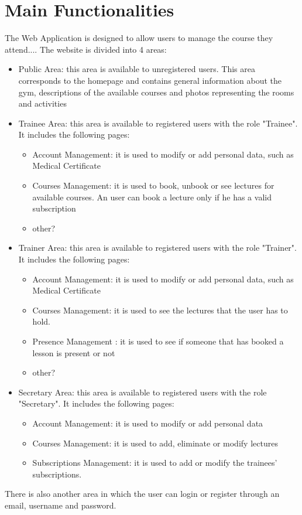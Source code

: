 \section{Main Functionalities}

The Web Application is designed to allow users to manage the course they attend....
The website is divided into 4 areas:

\begin{itemize}
	\item Public Area: this area is available to unregistered users. This area corresponds to the homepage and contains general information about the gym, descriptions of the available courses and photos representing the rooms and activities
	\item Trainee Area: this area is available to registered users with the role "Trainee". It includes the following pages:
	\begin{itemize}
		\item Account Management: it is used to modify or add personal data, such as Medical Certificate
		\item Courses Management: it is used to book, unbook or see lectures for available courses. An user can book a lecture only if he has a valid subscription
		\item other?
	\end{itemize}
	\item Trainer Area: this area is available to registered users with the role "Trainer". It includes the following pages:
	\begin{itemize}
		\item Account Management: it is used to modify or add personal data, such as Medical Certificate
		\item Courses Management: it is used to see the lectures that the user has to hold.
		\item Presence Management : it is used to see if someone that has booked a lesson is present or not
		\item other?
		
	\end{itemize}
	\item Secretary Area: this area is available to registered users with the role "Secretary".
	It includes the following pages:
	\begin{itemize}
		\item Account Management: it is used to modify or add personal data
		\item Courses Management: it is used to add, eliminate or modify lectures
		\item Subscriptions Management: it is used to add or modify the trainees' subscriptions.
	\end{itemize}
\end{itemize}
There is also another area in which the user can login or register through an email, username and password.\newline
